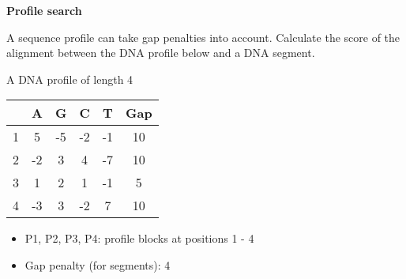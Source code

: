 \question \textbf{Profile search}

A sequence profile can take gap penalties into account. Calculate the score of the alignment between the DNA profile below and a DNA segment. 

\noindent
\begin{center}
A DNA profile of length 4
\end{center}
\begin{table}[H]
\centering
\begin{tabular}{|c|c|c|c|c|c|}
\hline
  & A  & G  & C  & T  & Gap \\ \hline
1 & 5  & -5 & -2 & -1 & 10  \\ \hline
2 & -2 & 3  & 4  & -7 & 10  \\ \hline
3 & 1  & 2  & 1  & -1 & 5   \\ \hline
4 & -3 & 3  & -2 & 7  & 10  \\ \hline
\end{tabular}
\end{table}

\begin{itemize}
\item P1, P2, P3, P4: profile blocks at positions 1 - 4
\item Gap penalty (for segments): 4 
\end{itemize}

\vspace{0.1 in}

